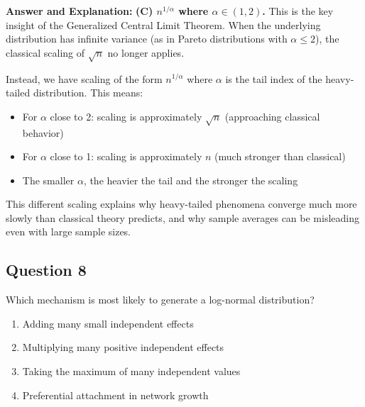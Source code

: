 \documentclass[11pt]{article}
\newenvironment{answer}{\color{answercolor}\begin{framed}\textbf{Answer and Explanation:}}{\end{framed}}
\begin{document}
\begin{answer}
\textbf{(C) $n^{1/\alpha}$ where $\alpha \in (1, 2)$.} This is the key insight of the Generalized Central Limit Theorem. When the underlying distribution has infinite variance (as in Pareto distributions with $\alpha \leq 2$), the classical scaling of $\sqrt{n}$ no longer applies.

Instead, we have scaling of the form $n^{1/\alpha}$ where $\alpha$ is the tail index of the heavy-tailed distribution. This means:
\begin{itemize}
    \item For $\alpha$ close to 2: scaling is approximately $\sqrt{n}$ (approaching classical behavior)
    \item For $\alpha$ close to 1: scaling is approximately $n$ (much stronger than classical)
    \item The smaller $\alpha$, the heavier the tail and the stronger the scaling
\end{itemize}

This different scaling explains why heavy-tailed phenomena converge much more slowly than classical theory predicts, and why sample averages can be misleading even with large sample sizes.
\end{answer}

\subsection{Question 8}
Which mechanism is most likely to generate a log-normal distribution?

\begin{enumerate}[label=(\Alph*)]
    \item Adding many small independent effects
    \item Multiplying many positive independent effects
    \item Taking the maximum of many independent values
    \item Preferential attachment in network growth
\end{enumerate}
\end{document}
